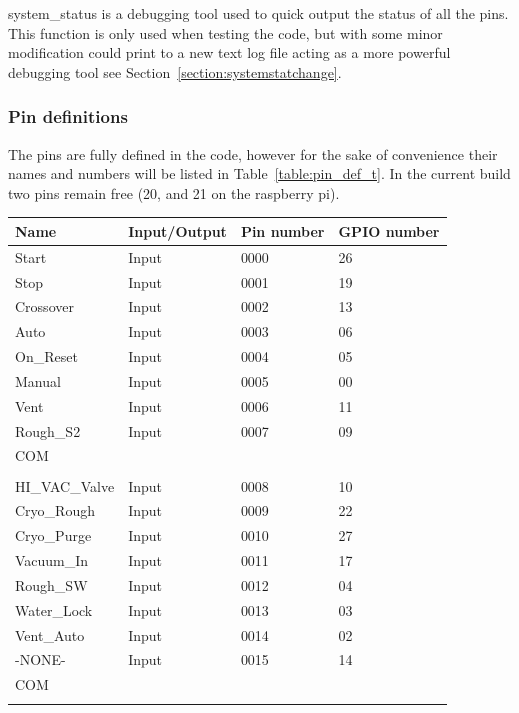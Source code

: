 \documentclass[titlepage]{article}
\begin{document}
system\_status is a debugging tool used to quick output the status of all the pins. This function is only used when testing the code, but with some minor modification could print to a new text log file acting as a more powerful debugging tool see Section~\ref{section:systemstatchange}.

\subsubsection{Pin definitions}
\label{section:pin_def}
The pins are fully defined in the code, however for the sake of convenience their names and numbers will be listed in Table~\ref{table:pin_def_t}. In the current build two pins remain free (20, and 21 on the raspberry pi).
\begin{table}[h!]
\centering
    \begin{tabular}{|l|l|l|l|}
    \hline
    Name  & Input/Output& Pin number & GPIO number    \\ \hline
    Start & Input & 0000 & 26   \\ \hline
    Stop & Input & 0001 & 19 \\ \hline
    Crossover & Input & 0002 & 13 \\ \hline
    Auto & Input & 0003 & 06 \\ \hline
    On\_Reset & Input & 0004 & 05 \\ \hline
    Manual & Input & 0005 & 00 \\ \hline
    Vent & Input & 0006 & 11 \\ \hline
    Rough\_S2 & Input & 0007 & 09 \\ \hline
    COM & & & \\ \hline
    & & & \\ \hline
    HI\_VAC\_Valve & Input & 0008 & 10 \\ \hline
    Cryo\_Rough & Input & 0009 & 22 \\ \hline
    Cryo\_Purge & Input & 0010 & 27 \\ \hline
    Vacuum\_In & Input & 0011 & 17 \\ \hline
    Rough\_SW & Input & 0012 & 04 \\ \hline
    Water\_Lock & Input & 0013 & 03 \\ \hline
    Vent\_Auto & Input & 0014 & 02 \\ \hline
    -NONE- & Input & 0015 & 14 \\ \hline
    COM &  &  &  \\ \hline
     &  &  &  \\ \hline

\end{tabular}
\end{table}
\end{document}
